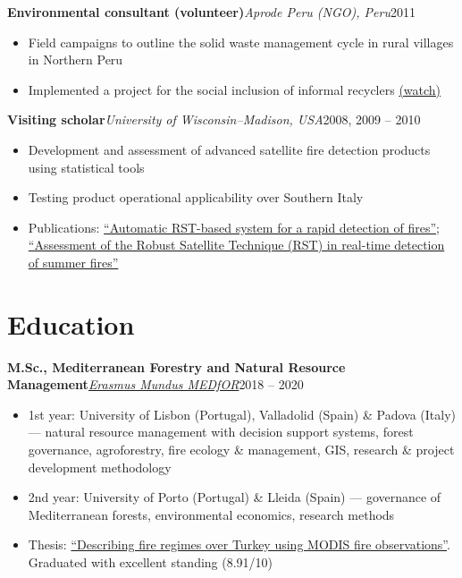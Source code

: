 \documentclass[10pt,a4paper]{article}
\newcommand{\role}[3]{%
  \textbf{#1}\hfill\textcolor{accent}{\textit{#2}}\hfill{#3}\par\vspace{0.15em}}
\begin{document}
\role{Environmental consultant (volunteer)}{Aprode Peru (NGO), Peru}{2011}
\begin{itemize}
\item Field campaigns to outline the solid waste management cycle in rural villages in Northern Peru
\item Implemented a project for the social inclusion of informal recyclers \href{https://www.youtube.com/watch?v=av93xA8a-ls}{(watch)}
\end{itemize}

\role{Visiting scholar}{University of Wisconsin--Madison, USA}{2008, 2009 -- 2010}
\begin{itemize}
\item Development and assessment of advanced satellite fire detection products using statistical tools
\item Testing product operational applicability over Southern Italy
\item Publications: \href{https://www.researchgate.net/publication/234055644_Automatic_RST-based_system_for_a_rapid_detection_of_fires}{``Automatic RST-based system for a rapid detection of fires''}; \href{https://www.researchgate.net/publication/306536266_Assessment_of_the_Robust_Satellite_Technique_RST_in_real_time_detection_of_summer_fires}{``Assessment of the Robust Satellite Technique (RST) in real-time detection of summer fires''}
\end{itemize}

\section{Education}

\role{M.Sc., Mediterranean Forestry and Natural Resource Management}{\href{https://www.medfor.eu/}{Erasmus Mundus MEDfOR}}{2018 -- 2020}
\begin{itemize}
\item 1st year: University of Lisbon (Portugal), Valladolid (Spain) \& Padova (Italy) --- natural resource management with decision support systems, forest governance, agroforestry, fire ecology \& management, GIS, research \& project development methodology
\item 2nd year: University of Porto (Portugal) \& Lleida (Spain) --- governance of Mediterranean forests, environmental economics, research methods
\item Thesis: \href{https://www.researchgate.net/publication/389813750_Describing_fire_regimes_over_Turkey_using_MODIS_fire_observations}{``Describing fire regimes over Turkey using MODIS fire observations''}. Graduated with excellent standing (8.91/10)
\end{itemize}
\end{document}
